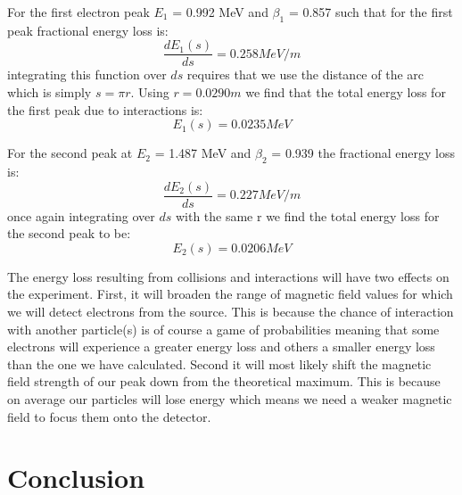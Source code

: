 For the first electron peak $E_1$ = 0.992 MeV and $\beta_1$ = 0.857 such that for the first peak fractional  energy loss is:
\begin{equation}
\frac{dE_1(s)}{ds} = 0.258 MeV/m
\end{equation}
integrating this function over $ds$ requires that we use the distance of the arc which is simply $s=\pi r$. Using $r = 0.0290 m$ we find that the total energy loss for the first peak due to interactions is:
\begin{equation}
E_1(s) = 0.0235 MeV
\end{equation} 

For the second peak at $E_2$ = 1.487 MeV and $\beta_2$ = 0.939 the fractional energy loss is:
\begin{equation}
\frac{dE_2(s)}{ds} = 0.227 MeV/m
\end{equation}
once again integrating over $ds$ with the same r we find the total energy loss for the second peak to be:
\begin{equation}
E_2 (s)= 0.0206 MeV
\end{equation}

The energy loss resulting from collisions and interactions will have two effects on the experiment.  First, it will broaden the range of magnetic field values for which we will detect electrons from the source. This is because the chance of interaction with another particle(s) is of course a game of probabilities meaning that some electrons will experience a greater energy loss and others a smaller energy loss than the one we have calculated.  Second it will most likely shift the magnetic field strength of our peak down from the theoretical maximum.  This is because on average our particles will lose energy which means we need a weaker magnetic field to focus them onto the detector.  
  


\section{Conclusion}
